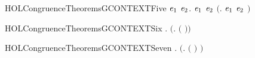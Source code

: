 \newcommand{\HOLCongruenceTheoremsGCONTEXTFour}{\UseVerbatim{HOLCongruenceTheoremsGCONTEXTFour}}
\begin{SaveVerbatim}{HOLCongruenceTheoremsGCONTEXTFive}
\HOLTokenTurnstile{} \HOLSymConst{\HOLTokenForall{}}\ensuremath{\HOLBoundVar{e}\sb{\mathrm{1}}} \ensuremath{\HOLBoundVar{e}\sb{\mathrm{2}}}.
        \ensuremath{\HOLBoundVar{e}\sb{\mathrm{1}}} \HOLSymConst{\HOLTokenConj{}}  \ensuremath{\HOLBoundVar{e}\sb{\mathrm{2}}} \HOLSymConst{\HOLTokenImp{}}  \ensuremath{(}\HOLTokenLambda{}. \ensuremath{\HOLBoundVar{e}\sb{\mathrm{1}}}  \HOLSymConst{\ensuremath{\mid}} \ensuremath{\HOLBoundVar{e}\sb{\mathrm{2}}} \ensuremath{)}
\end{SaveVerbatim}
\newcommand{\HOLCongruenceTheoremsGCONTEXTFive}{\UseVerbatim{HOLCongruenceTheoremsGCONTEXTFive}}
\begin{SaveVerbatim}{HOLCongruenceTheoremsGCONTEXTSix}
\HOLTokenTurnstile{} \HOLSymConst{\HOLTokenForall{}} .   \HOLSymConst{\HOLTokenImp{}}  \ensuremath{(}\HOLTokenLambda{}.   \ensuremath{(} \ensuremath{)}\ensuremath{)}
\end{SaveVerbatim}
\newcommand{\HOLCongruenceTheoremsGCONTEXTSix}{\UseVerbatim{HOLCongruenceTheoremsGCONTEXTSix}}
\begin{SaveVerbatim}{HOLCongruenceTheoremsGCONTEXTSeven}
\HOLTokenTurnstile{} \HOLSymConst{\HOLTokenForall{}} .   \HOLSymConst{\HOLTokenImp{}}  \ensuremath{(}\HOLTokenLambda{}.  \ensuremath{(} \ensuremath{)} \ensuremath{)}
\end{SaveVerbatim}
\newcommand{\HOLCongruenceTheoremsGCONTEXTSeven}{\UseVerbatim{HOLCongruenceTheoremsGCONTEXTSeven}}
